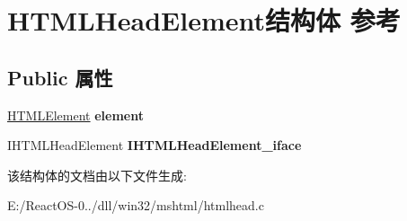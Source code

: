 \hypertarget{struct_h_t_m_l_head_element}{}\section{H\+T\+M\+L\+Head\+Element结构体 参考}
\label{struct_h_t_m_l_head_element}
\subsection*{Public 属性}
\begin{DoxyCompactItemize}
\item 
\mbox{\label{struct_h_t_m_l_head_element_a8ae0b718e86d67edf8ced60306dd51e0}} 
\hyperlink{struct_h_t_m_l_element}{H\+T\+M\+L\+Element} {\bfseries element}
\item 
\mbox{\label{struct_h_t_m_l_head_element_ad07417795d6a06347812b44a8e3b99b5}} 
I\+H\+T\+M\+L\+Head\+Element {\bfseries I\+H\+T\+M\+L\+Head\+Element\+\_\+iface}
\end{DoxyCompactItemize}


该结构体的文档由以下文件生成\+:\begin{DoxyCompactItemize}
\item 
E\+:/\+React\+O\+S-\/0../dll/win32/mshtml/htmlhead.\+c\end{DoxyCompactItemize}
